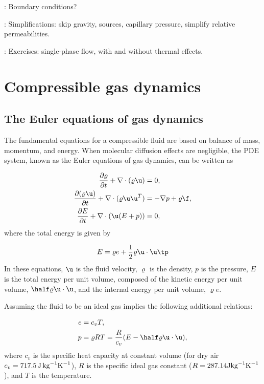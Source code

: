 \documentclass[graybox,envcountchap,sectrefs,final]{svmonodo}
\newcommand{\shortinlinecomment}[3]{{\color{red}{\bf #1}: #2}}
\begin{document}
\shortinlinecomment{hpl 10}{ Boundary conditions? }{ Boundary conditions? }

\shortinlinecomment{hpl 11}{ Simplifications: skip gravity, sources, capillary pressure, simplify relative permeabilities. }{ Simplifications: skip gravity, sources, }

\shortinlinecomment{hpl 12}{ Exercises: single-phase flow, with and without thermal effects. }{ Exercises: single-phase flow, with }

\section{Compressible gas dynamics}
\label{scale:gasdyn}

\subsection{The Euler equations of gas dynamics}
\label{scale:Euler_eqs}



The fundamental equations for a compressible fluid are based on balance
of mass, momentum, and energy. When molecular diffusion effects are
negligible, the PDE system, known as the Euler
equations of gas dynamics, can be written as

\begin{align}
\frac{\partial\varrho}{\partial t} + \nabla\cdot(\varrho\u) &= 0,
\label{scale:Euler_eqs:mass}\\ 
\frac{\partial(\varrho\u)}{\partial t} + \nabla\cdot(\varrho\u\u^T) &= -\nabla p + \varrho \f,
\label{scale:Euler_eqs:mom}\\ 
\frac{\partial E}{\partial t} + \nabla\cdot(\u(E+p)) &= 0,
\label{scale:Euler_eqs:energy}
\end{align}
where the total energy is given by

\begin{equation}
E = \varrho e + \frac{1}{2}\varrho\u\cdot\u\tp
\label{scale:Euler_eqs:E}
\end{equation}
In these equations, $\u$ is the fluid velocity, $\varrho$ is the density,
$p$ is the pressure, $E$ is the total energy per unit volume, composed
of the kinetic energy per unit volume, $\half\varrho \u\cdot\u$, and the
internal energy per unit volume, $\varrho e$.

Assuming the fluid to be an ideal gas implies the following additional
relations:

\begin{align}
e &= c_v T,
\label{scale:Euler_eqs:e}\\ 
p &= \varrho RT = \frac{R}{c_v}(E-\half\varrho \u\cdot\u),
\label{scale:Euler_eqs:p}
\end{align}
where $c_v$ is the specific heat capacity at constant volume (for dry air
$c_v = 717.5\, \hbox{J}\,\hbox{kg}^{-1}\hbox{K}^{-1}$),
$R$ is the specific ideal gas constant
($R=287.14 \hbox{J}\hbox{kg}^{-1}\hbox{K}^{-1}$), and $T$ is the temperature.
\end{document}
